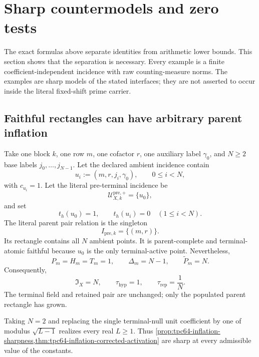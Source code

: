 \section{Sharp countermodels and zero tests}
\label{sec:tpc64-sharp-countermodels}

The exact formulas above separate identities from arithmetic lower bounds.
This section shows that the separation is necessary.  Every example is a
finite coefficient-independent incidence with raw counting-measure norms.
The examples are sharp models of the stated interfaces; they are not
asserted to occur inside the literal fixed-shift prime carrier.

\subsection{Faithful rectangles can have arbitrary parent inflation}

\begin{example}
\label{ex:tpc64-arbitrary-faithful-inflation}
Take one block \(k\), one row \(m\), one cofactor \(r\), one auxiliary
label \(\gamma_0\), and \(N\ge2\) base labels
\(j_0,\ldots,j_{N-1}\).  Let the declared ambient incidence contain
\[
 u_i:=(m,r,j_i,\gamma_0),\qquad 0\le i<N,
\]
with \(c_{u_i}=1\).  Let the literal pre-terminal incidence be
\[
 \mathcal U_{X,k}^{\mathrm{pre},+}=\{u_0\},
\]
and set
\[
 t_h(u_0)=1,\qquad t_h(u_i)=0\quad(1\le i<N).
\]
The literal parent pair relation is the singleton
\[
 I_{\mathrm{pre},k}=\{(m,r)\}.
\]
Its rectangle contains all \(N\) ambient points.  It is parent-complete
and terminal-atomic faithful because \(u_0\) is the only terminal-active
point.  Nevertheless,
\begin{equation}
 P_m=H_m=T_m=1,\qquad
 \Delta_m=N-1,\qquad
 \widetilde P_m=N.
 \label{eq:tpc64-arbitrary-inflation-data}
\end{equation}
Consequently,
\begin{equation}
 \mathfrak I_X=N,\qquad
 \tau_{\mathrm{hyp}}=1,\qquad
 \tau_{\mathrm{rep}}=\frac1N.
 \label{eq:tpc64-arbitrary-inflation-constants}
\end{equation}
The terminal field and retained pair are unchanged; only the populated
parent rectangle has grown.

Taking \(N=2\) and replacing the single terminal-null unit coefficient by
one of modulus \(\sqrt{L-1}\) realizes every real \(L\ge1\).  Thus
\cref{prop:tpc64-inflation-sharpness,thm:tpc64-inflation-corrected-activation}
are sharp at every admissible value of the constants.
\end{example}


